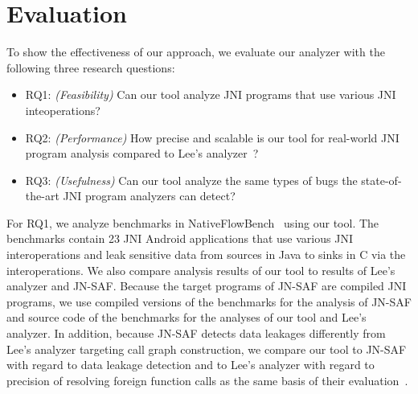 \newcommand{\req}[1]{RQ#1}

\section{Evaluation}

%
%

To show the effectiveness of our approach, we evaluate our analyzer with the
following three research questions:
\begin{itemize}
  \item \req{1}: {\it (Feasibility)} Can our tool analyze JNI programs that use
    various JNI inteoperations?

  \item \req{2}: {\it (Performance)} How precise and scalable is our tool for
    real-world JNI program analysis compared to Lee's analyzer~\cite{LeeASE20}?

  \item \req{3}: {\it (Usefulness)} Can our tool analyze the same types of bugs
    the state-of-the-art JNI program analyzers can detect?
\end{itemize}


For \req{1}, we analyze benchmarks in NativeFlowBench~\cite{nativeflowbench,
JN-SAF} using our tool. The benchmarks contain 23 JNI Android applications that
use various JNI interoperations and leak sensitive data from sources in Java to
sinks in C via the interoperations. We also compare analysis results of our
tool to results of Lee's analyzer and JN-SAF. Because the target programs of
JN-SAF are compiled JNI programs, we use compiled versions of the benchmarks
for the analysis of JN-SAF and source code of the benchmarks for the analyses
of our tool and Lee's analyzer. In addition, because JN-SAF detects data
leakages differently from Lee's analyzer targeting call graph construction, we
compare our tool to JN-SAF with regard to data leakage detection and to Lee's
analyzer with regard to precision of resolving foreign function calls as the
same basis of their evaluation~\cite{LeeASE20}.

